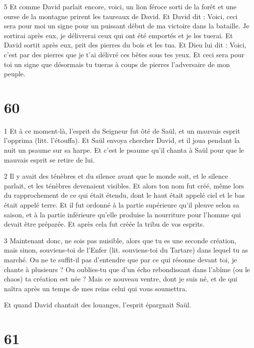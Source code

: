 \par 5 Et comme David parlait encore, voici, un lion féroce sorti de la forêt et une ourse de la montagne prirent les taureaux de David. Et David dit : Voici, ceci sera pour moi un signe pour un puissant début de ma victoire dans la bataille. Je sortirai après eux, je délivrerai ceux qui ont été emportés et je les tuerai. Et David sortit après eux, prit des pierres du bois et les tua. Et Dieu lui dit : Voici, c'est par des pierres que je t'ai délivré ces bêtes sous tes yeux. Et ceci sera pour toi un signe que désormais tu tueras à coups de pierres l'adversaire de mon peuple.

\chapter{60}

\par 1 Et à ce moment-là, l'esprit du Seigneur fut ôté de Saül, et un mauvais esprit l'opprima (litt. l'étouffa). Et Saül envoya chercher David, et il joua pendant la nuit un psaume sur sa harpe. Et c'est le psaume qu'il chanta à Saül pour que le mauvais esprit se retire de lui.

\par 2 Il y avait des ténèbres et du silence avant que le monde soit, et le silence parlait, et les ténèbres devenaient visibles. Et alors ton nom fut créé, même lors du rapprochement de ce qui était étendu, dont le haut était appelé ciel et le bas était appelé terre. Et il fut ordonné à la partie supérieure qu'il pleuve selon sa saison, et à la partie inférieure qu'elle produise la nourriture pour l'homme qui devait être préparée. Et après cela fut créée la tribu de vos esprits.

\par 3 Maintenant donc, ne sois pas nuisible, alors que tu es une seconde création, mais sinon, souviens-toi de l'Enfer (lit. souviens-toi du Tartare) dans lequel tu as marché. Ou ne te suffit-il pas d'entendre que par ce qui résonne devant toi, je chante à plusieurs ? Ou oublies-tu que d'un écho rebondissant dans l'abîme (ou le chaos) ta création est née ? Mais ce nouveau ventre, dont je suis né, et de qui naîtra après un temps de mes reins celui qui vous soumettra.

\par Et quand David chantait des louanges, l'esprit épargnait Saül.

\chapter{61}

